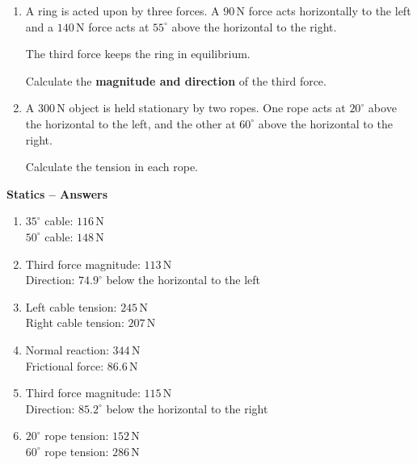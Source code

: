 \documentclass[12pt,a4paper]{article}
\begin{document}
\begin{enumerate}[leftmargin=*, itemsep=1em]
\vspace{1.2cm}

\item
A ring is acted upon by three forces.
A \(90\,\mathrm{N}\) force acts horizontally to the left and
a \(140\,\mathrm{N}\) force acts at \(55^\circ\) above the
horizontal to the right.

The third force keeps the ring in equilibrium.

Calculate the \textbf{magnitude and direction} of the third force.

\vspace{1.2cm}

\item
A \(300\,\mathrm{N}\) object is held stationary by two ropes.
One rope acts at \(20^\circ\) above the horizontal to the left,
and the other at \(60^\circ\) above the horizontal to the right.

Calculate the tension in each rope.

\end{enumerate}

\newpage

\begin{center}
    {\Large\textbf{Statics -- Answers}}
\end{center}

\vspace{0.5cm}

\begin{enumerate}[leftmargin=*, itemsep=1em]

\item
\(35^\circ\) cable: \(116\,\mathrm{N}\) \\
\(50^\circ\) cable: \(148\,\mathrm{N}\)

\item
Third force magnitude: \(113\,\mathrm{N}\) \\
Direction: \(74.9^\circ\) below the horizontal to the left

\item
Left cable tension: \(245\,\mathrm{N}\) \\
Right cable tension: \(207\,\mathrm{N}\)

\item
Normal reaction: \(344\,\mathrm{N}\) \\
Frictional force: \(86.6\,\mathrm{N}\)

\item
Third force magnitude: \(115\,\mathrm{N}\) \\
Direction: \(85.2^\circ\) below the horizontal to the right

\item
\(20^\circ\) rope tension: \(152\,\mathrm{N}\) \\
\(60^\circ\) rope tension: \(286\,\mathrm{N}\)

\end{enumerate}
\end{document}

